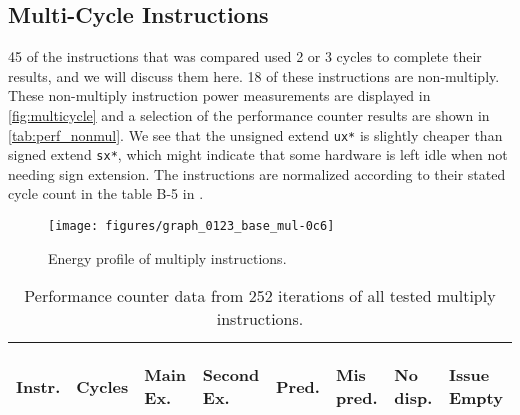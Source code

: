 \subsection{Multi-Cycle Instructions}


45 of the instructions that was compared used 2 or 3 cycles to complete their
results, and we will discuss them here. 18 of these instructions are
non-multiply. These non-multiply instruction power measurements are displayed in
\autoref{fig:multicycle} and a selection of the performance counter results are
shown in \autoref{tab:perf_nonmul}. We see that the unsigned extend \texttt{ux*}
is slightly cheaper than signed extend \texttt{sx*}, which might indicate that
some hardware is left idle when not needing sign extension. The instructions are
normalized according to their stated cycle count in the table B-5 in
\cite{armtech}.

\begin{figure*}
    \centering
    \texttt{[image: figures/graph\_0123\_base\_mul-0c6]}
    \caption{Energy profile of multiply instructions.}
    \label{fig:allmul}
\end{figure*}

\begin{table}
    \centering
    \begin{tabular}{|p{0.7cm}|R{0.8cm}R{0.6cm}R{0.85cm}R{0.6cm}R{0.45cm}R{0.75cm}R{0.72cm}|}
        \hline
        \centering
        Instr. &
        \centering
        Cycles &
        \centering
        Main Ex. &
        \centering
        Second Ex. &
        \centering
        Pred.&
        \centering
        Mis pred.&
        \centering
        No disp. &
        \begin{centering}
        Issue Empty
        \end{centering}
        \\
        \hline
        
        \hline
    \end{tabular}
    \caption{Performance counter data from 252 iterations of all tested multiply
    instructions.}
    \label{tab:perf_mul}
\end{table}


